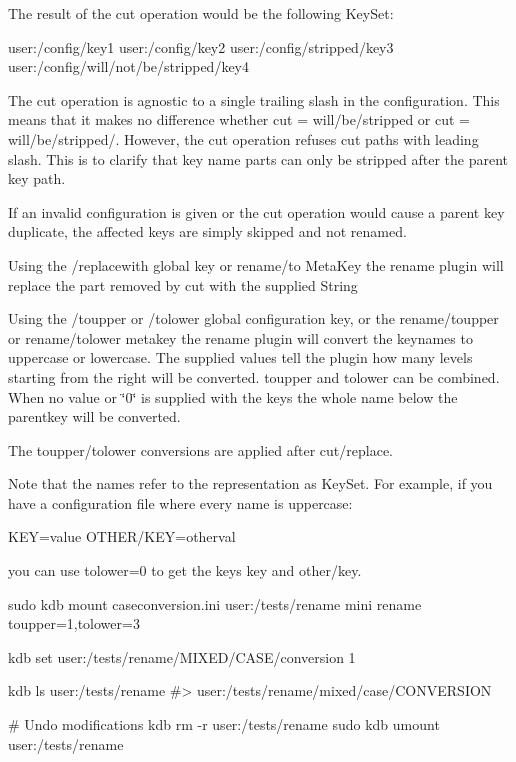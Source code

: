 The result of the cut operation would be the following Key\+Set\+:


\begin{DoxyCode}
user:/config/key1
user:/config/key2
user:/config/stripped/key3
user:/config/will/not/be/stripped/key4
\end{DoxyCode}


The cut operation is agnostic to a single trailing slash in the configuration. This means that it makes no difference whether {\ttfamily cut = will/be/stripped} or {\ttfamily cut = will/be/stripped/}. However, the cut operation refuses cut paths with leading slash. This is to clarify that key name parts can only be stripped after the parent key path.

If an invalid configuration is given or the cut operation would cause a parent key duplicate, the affected keys are simply skipped and not renamed.

Using the {\ttfamily /replacewith} global key or {\ttfamily rename/to} Meta\+Key the rename plugin will replace the part removed by {\ttfamily cut} with the supplied String

Using the {\ttfamily /toupper} or {\ttfamily /tolower} global configuration key, or the {\ttfamily rename/toupper} or {\ttfamily rename/tolower} metakey the rename plugin will convert the keynames to uppercase or lowercase. The supplied values tell the plugin how many levels starting from the right will be converted. {\ttfamily toupper} and {\ttfamily tolower} can be combined. When no value or \char`\"{}0\char`\"{} is supplied with the keys the whole name below the parentkey will be converted.

The toupper/tolower conversions are applied after cut/replace.

Note that the names refer to the representation as Key\+Set. For example, if you have a configuration file where every name is uppercase\+:


\begin{DoxyCode}
KEY=value
OTHER/KEY=otherval
\end{DoxyCode}


you can use {\ttfamily tolower=0} to get the keys {\ttfamily key} and {\ttfamily other/key}.


\begin{DoxyCode}
sudo kdb mount caseconversion.ini user:/tests/rename mini rename toupper=1,tolower=3

kdb set user:/tests/rename/MIXED/CASE/conversion 1

kdb ls user:/tests/rename
#> user:/tests/rename/mixed/case/CONVERSION

# Undo modifications
kdb rm -r user:/tests/rename
sudo kdb umount user:/tests/rename
\end{DoxyCode}


